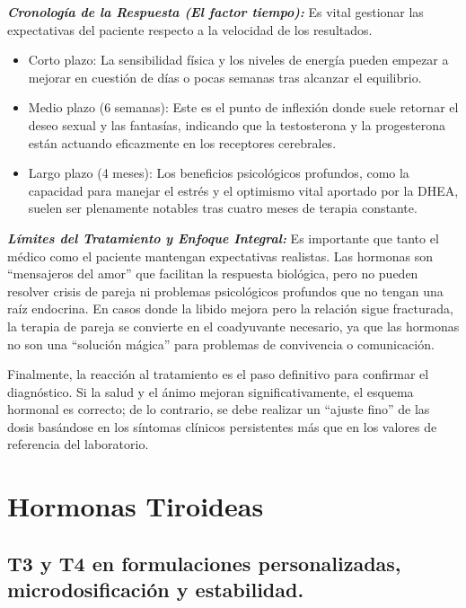 \documentclass[
  spanish,
]{article}
\begin{document}
\textbf{\emph{Cronología de la Respuesta (El factor tiempo):}}
Es vital gestionar las expectativas del paciente respecto a la velocidad de los resultados.

\begin{itemize}
\item
  Corto plazo: La sensibilidad física y los niveles de energía pueden empezar a mejorar en cuestión de días o pocas semanas tras alcanzar el equilibrio.
\item
  Medio plazo (6 semanas): Este es el punto de inflexión donde suele retornar el deseo sexual y las fantasías, indicando que la testosterona y la progesterona están actuando eficazmente en los receptores cerebrales.
\item
  Largo plazo (4 meses): Los beneficios psicológicos profundos, como la capacidad para manejar el estrés y el optimismo vital aportado por la DHEA, suelen ser plenamente notables tras cuatro meses de terapia constante.
\end{itemize}

\textbf{\emph{Límites del Tratamiento y Enfoque Integral:}} Es importante que tanto el médico como el paciente mantengan expectativas realistas. Las hormonas son ``mensajeros del amor'' que facilitan la respuesta biológica, pero no pueden resolver crisis de pareja ni problemas psicológicos profundos que no tengan una raíz endocrina. En casos donde la libido mejora pero la relación sigue fracturada, la terapia de pareja se convierte en el coadyuvante necesario, ya que las hormonas no son una ``solución mágica'' para problemas de convivencia o comunicación.

Finalmente, la reacción al tratamiento es el paso definitivo para confirmar el diagnóstico. Si la salud y el ánimo mejoran significativamente, el esquema hormonal es correcto; de lo contrario, se debe realizar un ``ajuste fino'' de las dosis basándose en los síntomas clínicos persistentes más que en los valores de referencia del laboratorio.

\section{Hormonas Tiroideas}\label{Tiroides}

\subsection{T3 y T4 en formulaciones personalizadas, microdosificación y estabilidad.}\label{t3-y-t4-en-formulaciones-personalizadas-microdosificaciuxf3n-y-estabilidad.}
\end{document}
